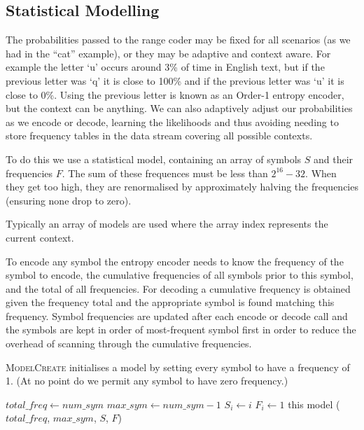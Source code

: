 \documentclass[a4paper]{article}
\begin{document}
\begin{algorithmic}[1]
   
    \State {}
  \EndFor
\EndProcedure
\end{algorithmic}


\subsection{Statistical Modelling}

The probabilities passed to the range coder may be fixed for all scenarios (as we had in the ``cat'' example), or they may be adaptive and context aware.
For example the letter `u' occurs around 3\% of time in English text, but if the previous letter was `q' it is close to 100\% and if the previous letter was `u' it is close to 0\%.
Using the previous letter is known as an Order-1 entropy encoder, but the context can be anything.
We can also adaptively adjust our probabilities as we encode or
decode, learning the likelihoods and thus avoiding needing to store
frequency tables in the data stream covering all possible contexts.

To do this we use a statistical model, containing an array of symbols $S$ and their frequencies $F$.
The sum of these frequences must be less than $2^{16}-32$.
When they get too high, they are renormalised by approximately halving the frequencies (ensuring none drop to zero).

Typically an array of models are used where the array index represents the current context.

To encode any symbol the entropy encoder needs to know the frequency of the symbol to encode, the cumulative frequencies of all symbols prior to this symbol, and the total of all frequencies.
For decoding a cumulative frequency is obtained given the frequency total and the appropriate symbol is found matching this frequency.
Symbol frequencies are updated after each encode or decode call and the symbols are kept in order of most-frequent symbol first in order to  reduce the overhead of scanning through the cumulative frequencies.

\textsc{ModelCreate} initialises a model by setting every symbol to have a frequency of 1.
(At no point do we permit any symbol to have zero frequency.)

\begin{algorithmic}[1]
  \State $total\_freq \gets num\_sym$
  \State $max\_sym \gets num\_sym-1$
    \State $S_i \gets i$
    \State $F_i \gets 1$
  \EndFor
  \State \Return this model ($total\_freq$, $max\_sym$, $S$, $F$)
\EndFunction
\end{algorithmic}
\end{document}
